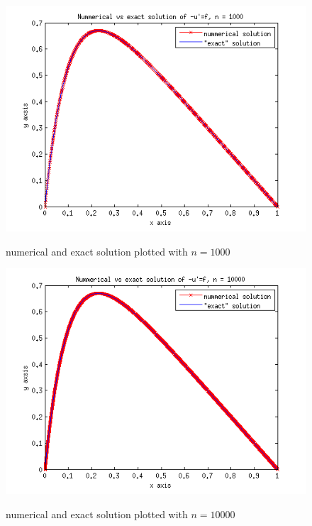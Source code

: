 \documentclass[a4paper,english, 10pt, twoside]{article}
\begin{document}
\begin{figure}[H]
\begin{center}
 \includegraphics[scale=0.75]{plot_n1000.png}\\
\caption{numerical and exact solution plotted with $n = 1000$}
\end{center}
\end{figure}
\begin{figure}[H]
\begin{center}
 \includegraphics[scale=0.75]{plot_n10000.png}\\
\caption{numerical and exact solution plotted with $n = 10000$}
\end{center}
\end{figure}
\end{document}
